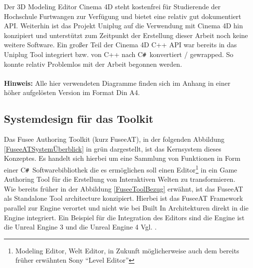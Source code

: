 \documentclass[pagesize, paper=a4, fontsize=12pt, titlepage=true, headings=small, headnosepline, abstractoff, liststotoc, nochapterprefix, plainheadsepline, twoside]{scrreprt}
\newcommand{\CSS}{C\texttt{\# }}
\begin{document}
Der 3D Modeling Editor Cinema 4D steht kostenfrei für Studierende der Hochschule Furtwangen zur Verfügung und bietet eine relativ gut dokumentiert API. Weiterhin ist das Projekt Uniplug auf die Verwendung mit Cinema 4D hin konzipiert und unterstützt zum Zeitpunkt der Erstellung dieser Arbeit noch keine weitere Software. Ein großer Teil der Cinema 4D C++ API war bereits in das Uniplug Tool integriert bzw. von C++ nach \CSS konvertiert / gewrapped. So konnte relativ Problemlos mit der Arbeit begonnen werden.
\\
\\
\textbf{Hinweis:} Alle hier verwendeten Diagramme finden sich im Anhang in einer höher aufgelösten Version im Format Din A4.

\subsection{Systemdesign für das Toolkit}
Das Fusee Authoring Toolkit (kurz FuseeAT), in der folgenden Abbildung \ref{FuseeATSystemÜberblick} in grün dargestellt, ist das Kernsystem dieses Konzeptes. Es handelt sich hierbei um eine Sammlung von Funktionen in Form einer \CSS Softwarebibliothek die es ermöglichen soll einen Editor\footnote{Modeling Editor, Welt Editor, in Zukunft  möglicherweise auch dem bereits früher erwähnten Sony “Level Editor”} in ein Game Authoring Tool für die Erstellung von Interaktiven Welten zu transformieren. Wie bereits früher in der Abbildung \ref{FuseeToolBezug} erwähnt, ist das FuseeAT als Standalone Tool architecture konzipiert. Hierbei ist das FuseeAT Framework parallel zur Engine verortet und nicht wie bei Built In Architekturen direkt in die Engine integriert. Ein Beispiel für die Integration des Editors sind die Engine ist die Unreal Engine 3 und die Unreal Engine 4 Vgl. \parencite[S. 54-55]{Gregory2009}.
\end{document}
